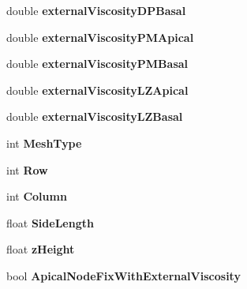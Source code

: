 \begin{DoxyCompactItemize}
\item 
\hypertarget{classSimulation_a2cb640995a5288502bd0ba3ea6a6c893}{}double {\bfseries external\+Viscosity\+D\+P\+Basal}\label{classSimulation_a2cb640995a5288502bd0ba3ea6a6c893}

\item 
\hypertarget{classSimulation_aa794b85325ceb5339a21c3166cc40313}{}double {\bfseries external\+Viscosity\+P\+M\+Apical}\label{classSimulation_aa794b85325ceb5339a21c3166cc40313}

\item 
\hypertarget{classSimulation_acdd300d98cfaa633b13e2d091aa17398}{}double {\bfseries external\+Viscosity\+P\+M\+Basal}\label{classSimulation_acdd300d98cfaa633b13e2d091aa17398}

\item 
\hypertarget{classSimulation_a7008c3c2a7451471a70bdffb4e97054e}{}double {\bfseries external\+Viscosity\+L\+Z\+Apical}\label{classSimulation_a7008c3c2a7451471a70bdffb4e97054e}

\item 
\hypertarget{classSimulation_a8bc411f696e2333c6501bd20fe0e4ab9}{}double {\bfseries external\+Viscosity\+L\+Z\+Basal}\label{classSimulation_a8bc411f696e2333c6501bd20fe0e4ab9}

\item 
\hypertarget{classSimulation_a3dc59b7f2368423781a41b0a457af1e4}{}int {\bfseries Mesh\+Type}\label{classSimulation_a3dc59b7f2368423781a41b0a457af1e4}

\item 
\hypertarget{classSimulation_a7e232e744b0c21c7d878dc454e74b898}{}int {\bfseries Row}\label{classSimulation_a7e232e744b0c21c7d878dc454e74b898}

\item 
\hypertarget{classSimulation_ad700818601343ea02758de553eaab8e3}{}int {\bfseries Column}\label{classSimulation_ad700818601343ea02758de553eaab8e3}

\item 
\hypertarget{classSimulation_a8f79cab9b0ff8dc3802e1bf1f903d1c7}{}float {\bfseries Side\+Length}\label{classSimulation_a8f79cab9b0ff8dc3802e1bf1f903d1c7}

\item 
\hypertarget{classSimulation_a27aa62c2297902e2e77159fe05362467}{}float {\bfseries z\+Height}\label{classSimulation_a27aa62c2297902e2e77159fe05362467}

\item 
\hypertarget{classSimulation_a27563e2e991aadaf7ff9629c90197459}{}bool {\bfseries Apical\+Node\+Fix\+With\+External\+Viscosity}\label{classSimulation_a27563e2e991aadaf7ff9629c90197459}


\end{DoxyCompactItemize}
